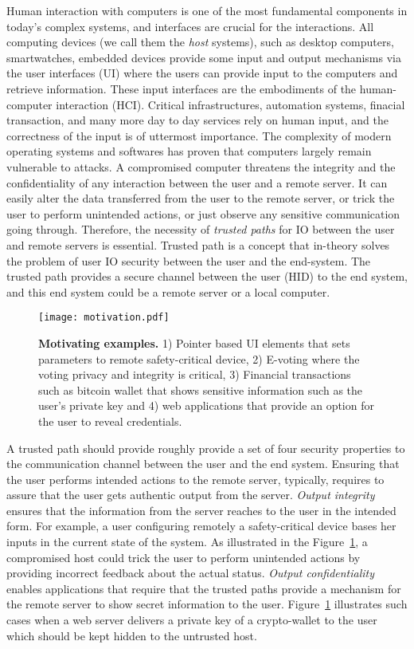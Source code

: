 Human interaction with computers is one of the most fundamental components in today's complex systems, and interfaces are crucial for the interactions. All computing devices (we call them the \emph{host} systems), such as desktop computers, smartwatches, embedded devices provide some input and output mechanisms via the user interfaces (UI) where the users can provide input to the computers and retrieve information. These input interfaces are the embodiments of the human-computer interaction (HCI). Critical infrastructures, automation systems, finacial transaction, and many more day to day services rely on human input, and the correctness of the input is of uttermost importance. The complexity of modern operating systems and softwares has proven that computers largely remain vulnerable to attacks. A compromised computer threatens the integrity and the confidentiality of any interaction between the user and a remote server. It can easily alter the data transferred from the user to the remote server, or trick the user to perform unintended actions, or just observe any sensitive communication going through. Therefore, the necessity of \emph{trusted paths} for IO between the user and remote servers is essential. Trusted path is a concept that in-theory solves the problem of user IO security between the user and the end-system. The trusted path provides a secure channel between the user (HID) to the end system, and this end system could be a remote server or a local computer. 

\begin{figure}[t]
\centering
\texttt{[image: motivation.pdf]}
\caption{\textbf{Motivating examples.} 1) Pointer based UI elements that sets parameters to remote safety-critical device, 2) E-voting where the voting privacy and integrity is critical, 3) Financial transactions such as bitcoin wallet that shows sensitive information such as the user's private key and 4) web applications that provide an option for the user to reveal credentials.}
\spacesave
\label{fig:motivation}
\centering
\end{figure}

A trusted path should provide roughly provide a set of four security properties to the communication channel between the user and the end system. Ensuring that the user performs intended actions to the remote server, typically, requires to assure that the user gets authentic output from the server. \emph{Output integrity} ensures that the information from the server reaches to the user in the intended form. For example, a user configuring remotely a safety-critical device bases her inputs in the current state of the system. As illustrated in the Figure~\ref{fig:motivation}, a compromised host could trick the user to perform unintended actions by providing incorrect feedback about the actual status. \emph{Output confidentiality} enables applications that require that the trusted paths provide a mechanism for the remote server to show secret information to the user. Figure~\ref{fig:motivation} illustrates such cases when a web server delivers a private key of a crypto-wallet to the user which should be kept hidden to the untrusted host.

